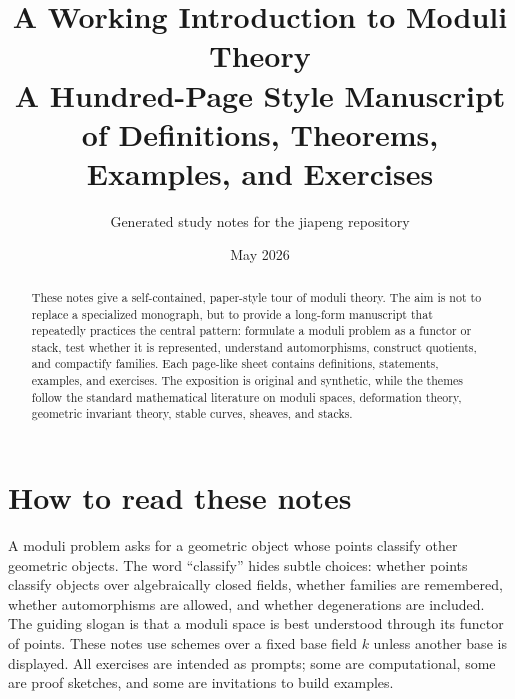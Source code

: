 \documentclass[11pt]{amsart}
\title{A Working Introduction to Moduli Theory\\A Hundred-Page Style Manuscript of Definitions, Theorems, Examples, and Exercises}
\author{Generated study notes for the jiapeng repository}
\date{May 2026}
\theoremstyle{definition}
\begin{document}
\begin{abstract}
These notes give a self-contained, paper-style tour of moduli theory.  The aim is not to replace a specialized monograph, but to provide a long-form manuscript that repeatedly practices the central pattern: formulate a moduli problem as a functor or stack, test whether it is represented, understand automorphisms, construct quotients, and compactify families.  Each page-like sheet contains definitions, statements, examples, and exercises.  The exposition is original and synthetic, while the themes follow the standard mathematical literature on moduli spaces, deformation theory, geometric invariant theory, stable curves, sheaves, and stacks.
\end{abstract}
\maketitle
\tableofcontents
\section*{How to read these notes}
A moduli problem asks for a geometric object whose points classify other geometric objects.  The word ``classify'' hides subtle choices: whether points classify objects over algebraically closed fields, whether families are remembered, whether automorphisms are allowed, and whether degenerations are included.  The guiding slogan is that a moduli space is best understood through its functor of points.  These notes use schemes over a fixed base field $k$ unless another base is displayed.  All exercises are intended as prompts; some are computational, some are proof sketches, and some are invitations to build examples.
\clearpage
\end{document}
